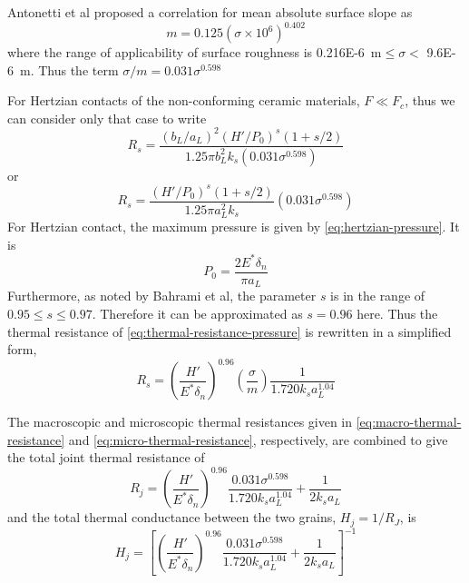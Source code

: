 Antonetti et al proposed a correlation for mean absolute surface slope as\cite{Antonetti1984}
\begin{equation}\label{eq:m-of-sigma}
	m = 0.125(\sigma\times10^6)^{0.402}
\end{equation}
where the range of applicability of surface roughness is \SI{0.216E-6}{\meter}$\le \sigma <$ \SI{9.6E-6}{\meter}. Thus the term $\sigma/m = 0.031\sigma^{0.598}$

For Hertzian contacts of the non-conforming ceramic materials, $F \ll F_c$, thus we can consider only that case to write
\begin{equation}
	R_s = \frac{(b_L/a_L)^2(H'/P_0)^s(1+s/2)}{1.25\pi b_L^2k_s(0.031\sigma^{0.598})}
\end{equation}
or
\begin{equation}\label{eq:thermal-resistance-pressure}
	R_s = \frac{(H'/P_0)^s(1+s/2)}{1.25\pi a_L^2k_s}\left(0.031\sigma^{0.598}\right)
\end{equation}
For Hertzian contact, the maximum pressure is given by \cref{eq:hertzian-pressure}. It is
\begin{equation*}
	P_0 = \frac{2E^*\delta_n}{\pi a_L}
\end{equation*}
Furthermore, as noted by Bahrami et al, the parameter $s$ is in the range of $0.95\le s\le 0.97$. Therefore it can be approximated as $s=0.96$ here. Thus the thermal resistance of \cref{eq:thermal-resistance-pressure} is rewritten in a simplified form,
\begin{equation}\label{eq:micro-thermal-resistance}
	R_s = \left(\frac{H'}{E^*\delta_n}\right)^{0.96}\left(\frac{\sigma}{m}\right)\frac{1}{1.720k_sa_L^{1.04}}
\end{equation}

The macroscopic and microscopic thermal resistances given in \cref{eq:macro-thermal-resistance} and \cref{eq:micro-thermal-resistance}, respectively, are combined to give the total joint thermal resistance of
\begin{equation}
	R_j = \left(\frac{H'}{E^*\delta_n}\right)^{0.96}\frac{0.031\sigma^{0.598}}{1.720k_sa_L^{1.04}} + \frac{1}{2k_sa_L}
\end{equation}
and the total thermal conductance between the two grains, $H_j = 1/R_J$, is
\begin{equation}\label{eq:micro-macro-conductance}
	H_j = \left[\left(\frac{H'}{E^*\delta_n}\right)^{0.96}\frac{0.031\sigma^{0.598}}{1.720k_sa_L^{1.04}} + \frac{1}{2k_sa_L}\right]^{-1}
\end{equation}

